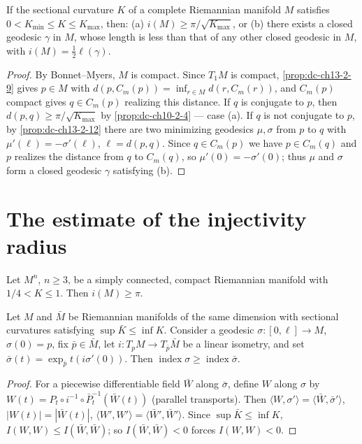 \begin{proposition}
  \label{prop:dc-ch13-2-13}
  If the sectional curvature $K$ of a complete Riemannian manifold $M$ satisfies
  $0<K_{\min}\leq K\leq K_{\max}$, then:
  (a) $i(M)\geq\pi/\sqrt{K_{\max}}$, or
  (b) there exists a closed geodesic $\gamma$ in $M$, whose length is less than that
    of any other closed geodesic in $M$, with $i(M)=\tfrac{1}{2}\ell(\gamma)$.
\end{proposition}
\begin{proof}
\sketch
  By Bonnet--Myers, $M$ is compact. Since $T_1M$ is
  compact, \cref{prop:dc-ch13-2-9} gives $p\in M$ with $d(p,C_m(p))=\inf_{r\in M}d(r,C_m(r))$,
  and $C_m(p)$ compact gives $q\in C_m(p)$ realizing this distance. If $q$ is conjugate
  to $p$, then $d(p,q)\geq\pi/\sqrt{K_{\max}}$ by \cref{prop:dc-ch10-2-4} — case
  (a). If $q$ is not conjugate to $p$, by \cref{prop:dc-ch13-2-12} there are two minimizing
  geodesics $\mu,\sigma$ from $p$ to $q$ with $\mu'(\ell)=-\sigma'(\ell)$,
  $\ell=d(p,q)$. Since $q\in C_m(p)$ we have $p\in C_m(q)$ and $p$ realizes the
  distance from $q$ to $C_m(q)$, so $\mu'(0)=-\sigma'(0)$; thus $\mu$ and $\sigma$ form
  a closed geodesic $\gamma$ satisfying (b).
\end{proof}

\section{The estimate of the injectivity radius}

\begin{proposition}
  \label{prop:dc-ch13-3-1}
  Let $M^n$, $n\geq 3$, be a simply connected, compact Riemannian manifold with
  $1/4<K\leq 1$. Then $i(M)\geq\pi$.
\end{proposition}

\begin{lemma}
  \label{lem:dc-ch13-3-2}
  Let $M$ and $\bar M$ be Riemannian manifolds of the same dimension with sectional
  curvatures satisfying $\sup\bar K\leq\inf K$. Consider a geodesic
  $\sigma:[0,\ell]\to M$, $\sigma(0)=p$, fix $\bar p\in\bar M$, let
  $i:T_pM\to T_{\bar p}\bar M$ be a linear isometry, and set
  $\bar\sigma(t)=\exp_{\bar p}t(i\sigma'(0))$. Then
  $\operatorname{index}\sigma\geq\operatorname{index}\bar\sigma$.
\end{lemma}
\begin{proof}
\sketch
  For a piecewise differentiable field $\bar W$ along $\bar\sigma$, define
  $W$ along $\sigma$ by $W(t)=P_t\circ i^{-1}\circ\bar P_t^{-1}(\bar W(t))$ (parallel
  transports). Then $\langle W,\sigma'\rangle=\langle\bar W,\bar\sigma'\rangle$,
  $|W(t)|=|\bar W(t)|$, $\langle W',W'\rangle=\langle\bar W',\bar W'\rangle$. Since
  $\sup\bar K\leq\inf K$, $I(W,W)\leq I(\bar W,\bar W)$; so $I(\bar W,\bar W)<0$ forces
  $I(W,W)<0$.
\end{proof}

